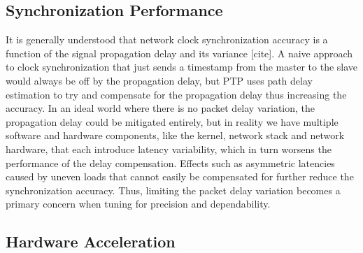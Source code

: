 \subsection{Synchronization Performance}
It is generally understood that network clock synchronization accuracy is a function of the signal propagation delay and its variance [cite]. A naive approach to clock synchronization that just sends a timestamp from the master to the slave would always be off by the propagation delay, but PTP uses path delay estimation to try and compensate for the propagation delay thus increasing the accuracy. In an ideal world where there is no packet delay variation, the propagation delay could be mitigated entirely, but in reality we have multiple software and hardware components, like the kernel, network stack and network hardware, that each introduce latency variability, which in turn worsens the performance of the delay compensation. Effects such as asymmetric latencies caused by uneven loads that cannot easily be compensated for further reduce the synchronization accuracy. Thus, limiting the packet delay variation becomes a primary concern when tuning for precision and dependability.

\subsection{Hardware Acceleration}

